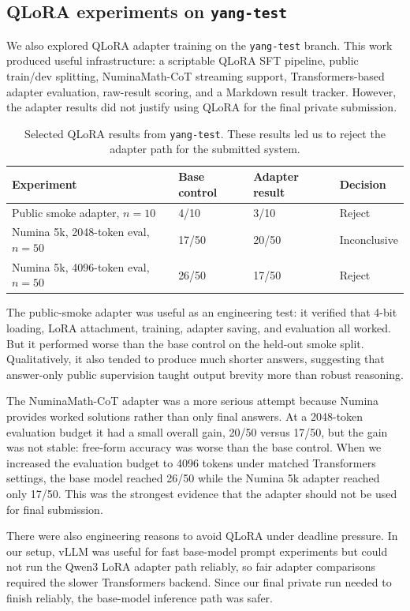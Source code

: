 \documentclass{article}
\begin{document}
\subsection{QLoRA experiments on \texttt{yang-test}}

We also explored QLoRA adapter training on the \texttt{yang-test} branch. This work produced useful infrastructure: a scriptable QLoRA SFT pipeline, public train/dev splitting, NuminaMath-CoT streaming support, Transformers-based adapter evaluation, raw-result scoring, and a Markdown result tracker. However, the adapter results did not justify using QLoRA for the final private submission.

\begin{table}[h]
\centering
\caption{Selected QLoRA results from \texttt{yang-test}. These results led us to reject the adapter path for the submitted system.}
\label{tab:qlora-results}
\begin{tabular}{llll}
\toprule
Experiment & Base control & Adapter result & Decision \\
\midrule
Public smoke adapter, $n=10$ & 4/10 & 3/10 & Reject \\
Numina 5k, 2048-token eval, $n=50$ & 17/50 & 20/50 & Inconclusive \\
Numina 5k, 4096-token eval, $n=50$ & 26/50 & 17/50 & Reject \\
\bottomrule
\end{tabular}
\end{table}

The public-smoke adapter was useful as an engineering test: it verified that 4-bit loading, LoRA attachment, training, adapter saving, and evaluation all worked. But it performed worse than the base control on the held-out smoke split. Qualitatively, it also tended to produce much shorter answers, suggesting that answer-only public supervision taught output brevity more than robust reasoning.

The NuminaMath-CoT adapter was a more serious attempt because Numina provides worked solutions rather than only final answers. At a 2048-token evaluation budget it had a small overall gain, 20/50 versus 17/50, but the gain was not stable: free-form accuracy was worse than the base control. When we increased the evaluation budget to 4096 tokens under matched Transformers settings, the base model reached 26/50 while the Numina 5k adapter reached only 17/50. This was the strongest evidence that the adapter should not be used for final submission.

There were also engineering reasons to avoid QLoRA under deadline pressure. In our setup, vLLM was useful for fast base-model prompt experiments but could not run the Qwen3 LoRA adapter path reliably, so fair adapter comparisons required the slower Transformers backend. Since our final private run needed to finish reliably, the base-model inference path was safer.
\end{document}
